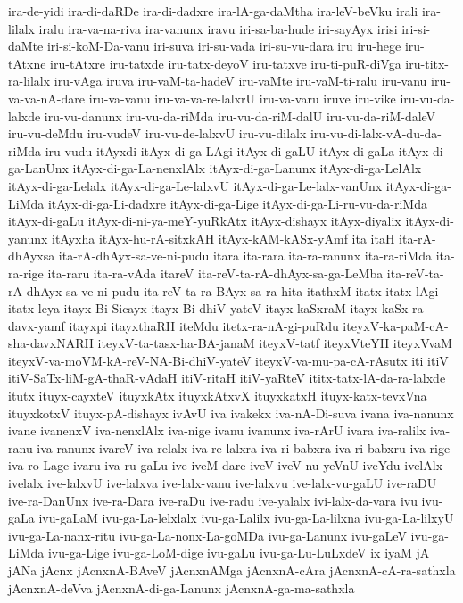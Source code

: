 {ira-de-yidi
ira-di-daRDe
ira-di-dadxre
ira-lA-ga-daMtha
ira-leV-beVku
irali
ira-lilalx
iralu
ira-va-na-riva
ira-vanunx
iravu
iri-sa-ba-hude
iri-sayAyx
irisi
iri-si-daMte
iri-si-koM-Da-vanu
iri-suva
iri-su-vada
iri-su-vu-dara
iru
iru-hege
iru-tAtxne
iru-tAtxre
iru-tatxde
iru-tatx-deyoV
iru-tatxve
iru-ti-puR-diVga
iru-titx-ra-lilalx
iru-vAga
iruva
iru-vaM-ta-hadeV
iru-vaMte
iru-vaM-ti-ralu
iru-vanu
iru-va-va-nA-dare
iru-va-vanu
iru-va-va-re-lalxrU
iru-va-varu
iruve
iru-vike
iru-vu-da-lalxde
iru-vu-danunx
iru-vu-da-riMda
iru-vu-da-riM-dalU
iru-vu-da-riM-daleV
iru-vu-deMdu
iru-vudeV
iru-vu-de-lalxvU
iru-vu-dilalx
iru-vu-di-lalx-vA-du-da-riMda
iru-vudu
itAyxdi
itAyx-di-ga-LAgi
itAyx-di-gaLU
itAyx-di-gaLa
itAyx-di-ga-LanUnx
itAyx-di-ga-La-nenxlAlx
itAyx-di-ga-Lanunx
itAyx-di-ga-LelAlx
itAyx-di-ga-Lelalx
itAyx-di-ga-Le-lalxvU
itAyx-di-ga-Le-lalx-vanUnx
itAyx-di-ga-LiMda
itAyx-di-ga-Li-dadxre
itAyx-di-ga-Lige
itAyx-di-ga-Li-ru-vu-da-riMda
itAyx-di-gaLu
itAyx-di-ni-ya-meY-yuRkAtx
itAyx-dishayx
itAyx-diyalix
itAyx-di-yanunx
itAyxha
itAyx-hu-rA-sitxkAH
itAyx-kAM-kASx-yAmf
ita
itaH
ita-rA-dhAyxsa
ita-rA-dhAyx-sa-ve-ni-pudu
itara
ita-rara
ita-ra-ranunx
ita-ra-riMda
ita-ra-rige
ita-raru
ita-ra-vAda
itareV
ita-reV-ta-rA-dhAyx-sa-ga-LeMba
ita-reV-ta-rA-dhAyx-sa-ve-ni-pudu
ita-reV-ta-ra-BAyx-sa-ra-hita
itathxM
itatx
itatx-lAgi
itatx-leya
itayx-Bi-Sicayx
itayx-Bi-dhiV-yateV
itayx-kaSxraM
itayx-kaSx-ra-davx-yamf
itayxpi
itayxthaRH
iteMdu
itetx-ra-nA-gi-puRdu
iteyxV-ka-paM-cA-sha-davxNARH
iteyxV-ta-tasx-ha-BA-janaM
iteyxV-tatf
iteyxVteYH
iteyxVvaM
iteyxV-va-moVM-kA-reV-NA-Bi-dhiV-yateV
iteyxV-va-mu-pa-cA-rAsutx
iti
itiV
itiV-SaTx-liM-gA-thaR-vAdaH
itiV-ritaH
itiV-yaRteV
ititx-tatx-lA-da-ra-lalxde
itutx
ituyx-cayxteV
ituyxkAtx
ituyxkAtxvX
ituyxkatxH
ituyx-katx-tevxVna
ituyxkotxV
ituyx-pA-dishayx
ivAvU
iva
ivakekx
iva-nA-Di-suva
ivana
iva-nanunx
ivane
ivanenxV
iva-nenxlAlx
iva-nige
ivanu
ivanunx
iva-rArU
ivara
iva-ralilx
iva-ranu
iva-ranunx
ivareV
iva-relalx
iva-re-lalxra
iva-ri-babxra
iva-ri-babxru
iva-rige
iva-ro-Lage
ivaru
iva-ru-gaLu
ive
iveM-dare
iveV
iveV-nu-yeVnU
iveYdu
ivelAlx
ivelalx
ive-lalxvU
ive-lalxva
ive-lalx-vanu
ive-lalxvu
ive-lalx-vu-gaLU
ive-raDU
ive-ra-DanUnx
ive-ra-Dara
ive-raDu
ive-radu
ive-yalalx
ivi-lalx-da-vara
ivu
ivu-gaLa
ivu-gaLaM
ivu-ga-La-lelxlalx
ivu-ga-Lalilx
ivu-ga-La-lilxna
ivu-ga-La-lilxyU
ivu-ga-La-nanx-ritu
ivu-ga-La-nonx-La-goMDa
ivu-ga-Lanunx
ivu-gaLeV
ivu-ga-LiMda
ivu-ga-Lige
ivu-ga-LoM-dige
ivu-gaLu
ivu-ga-Lu-LuLxdeV
ix
iyaM
jA
jANa
jAcnx
jAcnxnA-BAveV
jAcnxnAMga
jAcnxnA-cAra
jAcnxnA-cA-ra-sathxla
jAcnxnA-deVva
jAcnxnA-di-ga-Lanunx
jAcnxnA-ga-ma-sathxla
}
